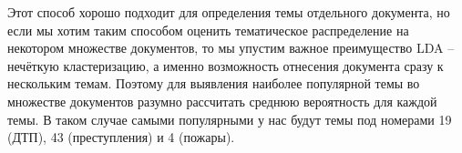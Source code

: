 Этот способ хорошо подходит для определения темы отдельного документа, но если мы хотим таким способом оценить тематическое распределение на некотором множестве документов, то мы упустим важное преимущество LDA -- нечёткую кластеризацию, а именно возможность отнесения документа сразу к нескольким темам. Поэтому для выявления наиболее популярной темы во множестве документов разумно рассчитать среднюю вероятность для каждой темы. В таком случае самыми популярными у нас будут темы под номерами 19 (ДТП), 43 (преступления) и 4 (пожары).

